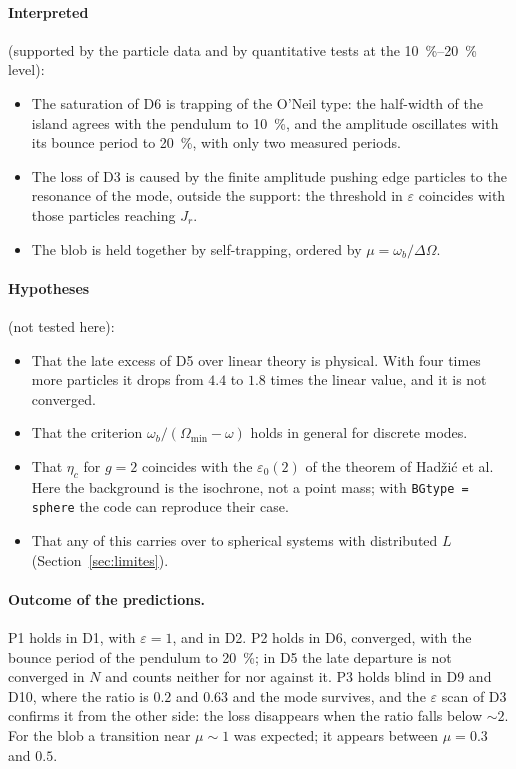 \documentclass[11pt,a4paper]{article}
\begin{document}
\paragraph{Interpreted} (supported by the particle data and by quantitative tests at the
\SIrange{10}{20}{\%} level):
\begin{itemize}
\item The saturation of D6 is trapping of the O'Neil type: the half-width of the island
agrees with the pendulum to \SI{10}{\%}, and the amplitude oscillates with its bounce period
to \SI{20}{\%}, with only two measured periods.
\item The loss of D3 is caused by the finite amplitude pushing edge particles to the
resonance of the mode, outside the support: the threshold in $\varepsilon$ coincides with
those particles reaching $J_r$.
\item The blob is held together by self-trapping, ordered by $\mu=\omega_b/\Delta\Omega$.
\end{itemize}

\paragraph{Hypotheses} (not tested here):
\begin{itemize}
\item That the late excess of D5 over linear theory is physical. With four times more
particles it drops from $4.4$ to $1.8$ times the linear value, and it is not converged.
\item That the criterion $\omega_b/(\Omega_{\min}-\omega)$ holds in general for discrete modes.
\item That $\eta_c$ for $g=2$ coincides with the $\varepsilon_0(2)$ of the theorem of Hadžić et
al. Here the background is the isochrone, not a point mass; with \texttt{BGtype = sphere}
the code can reproduce their case.
\item That any of this carries over to spherical systems with distributed $L$
(Section~\ref{sec:limites}).
\end{itemize}

\paragraph{Outcome of the predictions.}
\label{sec:predicciones_res}
P1 holds in D1, with $\varepsilon=1$, and in D2. P2 holds in D6, converged, with the
bounce period of the pendulum to \SI{20}{\%}; in D5 the late departure is not converged in
$N$ and counts neither for nor against it. P3 holds blind in D9 and D10, where the ratio
is $0.2$ and $0.63$ and the mode survives, and the $\varepsilon$ scan of D3 confirms it from
the other side: the loss disappears when the ratio falls below $\sim2$. For the blob a
transition near $\mu\sim1$ was expected; it appears between $\mu=0.3$ and $0.5$.
\end{document}

